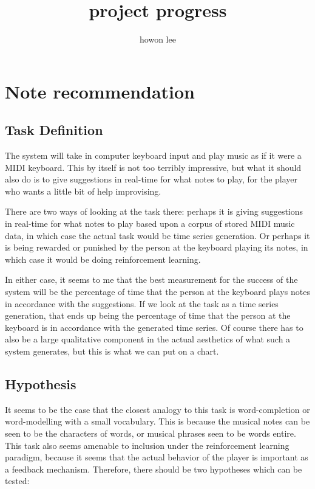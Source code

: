 \documentclass{article}
\begin{document}
\title{project progress}
\author{howon lee}
\maketitle
\section*{Note recommendation}

\subsection*{Task Definition}
The system will take in computer keyboard input and play music as if it were a MIDI keyboard. This by itself is not too terribly impressive, but what it should also do is to give suggestions in real-time for what notes to play, for the player who wants a little bit of help improvising.

There are two ways of looking at the task there: perhaps it is giving suggestions in real-time for what notes to play based upon a corpus of stored MIDI music data, in which case the actual task would be time series generation. Or perhaps it is being rewarded or punished by the person at the keyboard playing its notes, in which case it would be doing reinforcement learning.

In either case, it seems to me that the best measurement for the success of the system will be the percentage of time that the person at the keyboard plays notes in accordance with the suggestions. If we look at the task as a time series generation, that ends up being the percentage of time that the person at the keyboard is in accordance with the generated time series. Of course there has to also be a large qualitative component in the actual aesthetics of what such a system generates, but this is what we can put on a chart. 

\subsection*{Hypothesis}
It seems to be the case that the closest analogy to this task is word-completion or word-modelling with a small vocabulary. This is because the musical notes can be seen to be the characters of words, or musical phrases seen to be words entire. This task also seems amenable to inclusion under the reinforcement learning paradigm, because it seems that the actual behavior of the player is important as a feedback mechanism. Therefore, there should be two hypotheses which can
be tested:
\end{document}

